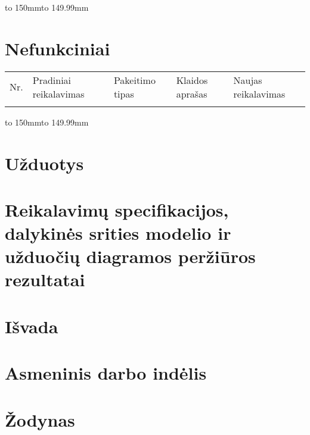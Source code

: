 \documentclass[oneside]{VUMIFPSkursinis}
\begin{document}

\hbox to 150mm{\hbox to 149.99mm{}}
 
\section{Nefunkciniai}


\begin{longtable}{ | p{}|p{}|p{}|p{}|p{}| }  \hline

Nr. & Pradiniai reikalavimas&  Pakeitimo tipas & Klaidos aprašas  & Naujas reikalavimas \\ \\ \hline


\end{longtable}
	

\hbox to 150mm{\hbox to 149.99mm{}}

\section{Užduotys}

\section{Reikalavimų specifikacijos, dalykinės srities modelio ir užduočių diagramos peržiūros rezultatai}

\section{Išvada}

\section{Asmeninis darbo indėlis}

\section{Žodynas}
\end{document}
